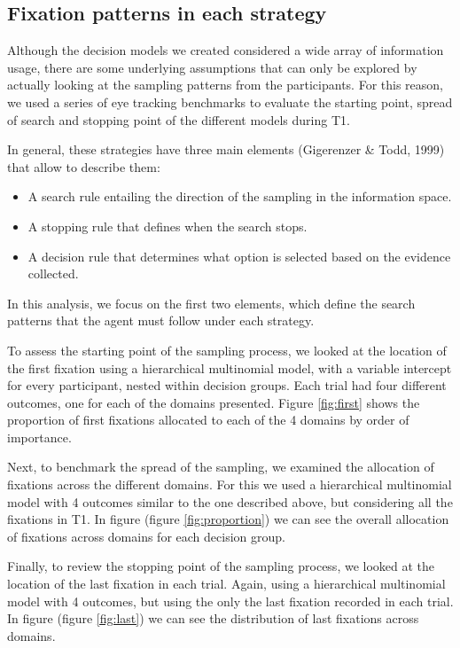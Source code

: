 \documentclass[
  english,
  man]{apa6}
\providecommand{\tightlist}{%
  \setlength{\itemsep}{0pt}\setlength{\parskip}{0pt}}
\begin{document}
\hypertarget{fixation-patterns-in-each-strategy}{%
\subsection{Fixation patterns in each strategy}\label{fixation-patterns-in-each-strategy}}

Although the decision models we created considered a wide array of information usage, there are some underlying assumptions that can only be explored by actually looking at the sampling patterns from the participants. For this reason, we used a series of eye tracking benchmarks to evaluate the starting point, spread of search and stopping point of the different models during T1.

In general, these strategies have three main elements (Gigerenzer \& Todd, 1999) that allow to describe them:

\begin{itemize}
\tightlist
\item
  A search rule entailing the direction of the sampling in the information space.
\item
  A stopping rule that defines when the search stops.
\item
  A decision rule that determines what option is selected based on the evidence collected.
\end{itemize}

In this analysis, we focus on the first two elements, which define the search patterns that the agent must follow under each strategy.

To assess the starting point of the sampling process, we looked at the location of the first fixation using a hierarchical multinomial model, with a variable intercept for every participant, nested within decision groups. Each trial had four different outcomes, one for each of the domains presented. Figure \ref{fig:first} shows the proportion of first fixations allocated to each of the 4 domains by order of importance.

Next, to benchmark the spread of the sampling, we examined the allocation of fixations across the different domains. For this we used a hierarchical multinomial model with 4 outcomes similar to the one described above, but considering all the fixations in T1. In figure (figure \ref{fig:proportion}) we can see the overall allocation of fixations across domains for each decision group.

Finally, to review the stopping point of the sampling process, we looked at the location of the last fixation in each trial. Again, using a hierarchical multinomial model with 4 outcomes, but using the only the last fixation recorded in each trial. In figure (figure \ref{fig:last}) we can see the distribution of last fixations across domains.
\end{document}
